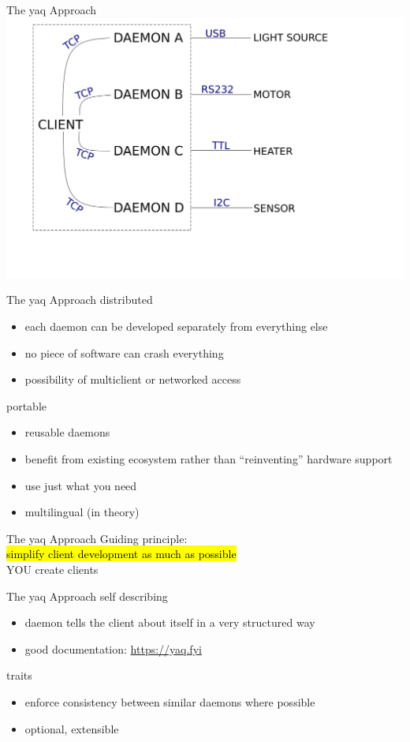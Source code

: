 \documentclass{presentation}
\begin{document}
\begin{frame}{The yaq Approach}
  \includegraphics[width=\textwidth]{./daemons.png}
\end{frame}

\begin{frame}{The yaq Approach}
  distributed
  \begin{itemize}
    \item each daemon can be developed separately from everything else
    \item no piece of software can crash everything
    \item possibility of multiclient or networked access
  \end{itemize}
  \vfill
  portable
  \begin{itemize}
    \item reusable daemons
    \item benefit from existing ecosystem rather than ``reinventing'' hardware support
    \item use just what you need
    \item multilingual (in theory)
  \end{itemize}
\end{frame}

\begin{frame}{The yaq Approach}
  \center
  \Large{
    Guiding principle: \\
    \hl{simplify client development as much as possible} \\
    \vfill
    YOU create clients
  }
\end{frame}

\begin{frame}{The yaq Approach}
  self describing
  \begin{itemize}
    \item daemon tells the client about itself in a very structured way
    \item good documentation: \url{https://yaq.fyi}
  \end{itemize}
  \vfill
  traits
  \begin{itemize}
    \item enforce consistency between similar daemons where possible
    \item optional, extensible
  \end{itemize}
\end{frame}
\end{document}
